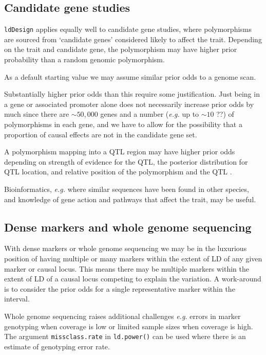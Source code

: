 \documentclass[a4paper,10pt]{amsart}
\def\ldDesign{\texttt{ldDesign}}
\def\eg{\textit{e.g.}}
\begin{document}
\subsection{Candidate gene studies}

\ldDesign{} applies equally well to candidate gene studies, where
polymorphisms are sourced from `candidate genes' considered likely to
affect the trait. Depending on the trait and candidate gene, the
polymorphism may have higher prior probability than a random genomic
polymorphism.

As a default starting value we may assume similar prior odds to a
genome scan.

Substantially higher prior odds than this require some
justification. Just being in a gene or associated promoter alone does
not necessarily increase prior odds by much since there are $\sim
50,000$ genes and a number (\eg{} up to $\sim 10$ ??) of polymorphisms
in each gene, and we have to allow for the possibility that a
proportion of causal effects are not in the candidate gene set.

A polymorphism mapping into a QTL region may have higher prior odds
depending on strength of evidence for the QTL, the posterior
distribution for QTL location, and relative position of the
polymorphism and the QTL \citep{Ball2007QTLcolocation}.

Bioinformatics, \eg{} where similar sequences have been found
in other species, and knowledge of gene action and pathways that 
affect the trait, may be useful.

\subsection{Dense markers and whole genome sequencing}

With dense markers or whole genome sequencing we may be in the
luxurious position of having multiple or many markers within the
extent of LD of any given marker or causal locus. This means there
may be multiple markers within the extent of LD of a causal locus
competing to explain the variation. A work-around is to consider the
prior odds for a single representative marker within the interval.

Whole genome sequencing raises additional challenges \eg{} errors in
marker genotyping when coverage is low or limited sample sizes when
coverage is high. The argument \texttt{missclass.rate} in
\texttt{ld.power()} can be used where there is an estimate of
genotyping error rate.
\end{document}
